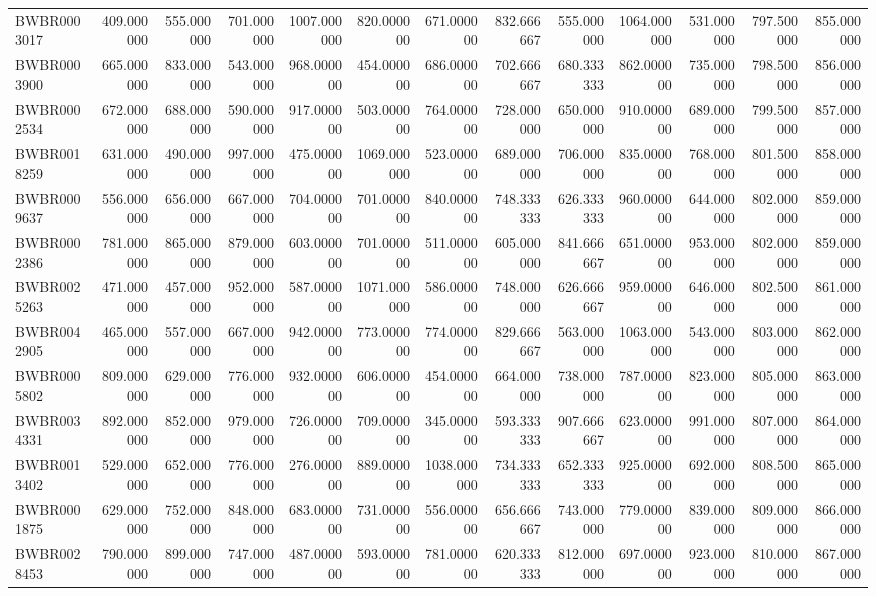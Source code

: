\begin{longtable}{lrrrrrrrrrrrr}
BWBR0003017 & 409.000000 & 555.000000 & 701.000000 & 1007.000000 & 820.000000 & 671.000000 & 832.666667 & 555.000000 & 1064.000000 & 531.000000 & 797.500000 & 855.000000 \\
BWBR0003900 & 665.000000 & 833.000000 & 543.000000 & 968.000000 & 454.000000 & 686.000000 & 702.666667 & 680.333333 & 862.000000 & 735.000000 & 798.500000 & 856.000000 \\
BWBR0002534 & 672.000000 & 688.000000 & 590.000000 & 917.000000 & 503.000000 & 764.000000 & 728.000000 & 650.000000 & 910.000000 & 689.000000 & 799.500000 & 857.000000 \\
BWBR0018259 & 631.000000 & 490.000000 & 997.000000 & 475.000000 & 1069.000000 & 523.000000 & 689.000000 & 706.000000 & 835.000000 & 768.000000 & 801.500000 & 858.000000 \\
BWBR0009637 & 556.000000 & 656.000000 & 667.000000 & 704.000000 & 701.000000 & 840.000000 & 748.333333 & 626.333333 & 960.000000 & 644.000000 & 802.000000 & 859.000000 \\
BWBR0002386 & 781.000000 & 865.000000 & 879.000000 & 603.000000 & 701.000000 & 511.000000 & 605.000000 & 841.666667 & 651.000000 & 953.000000 & 802.000000 & 859.000000 \\
BWBR0025263 & 471.000000 & 457.000000 & 952.000000 & 587.000000 & 1071.000000 & 586.000000 & 748.000000 & 626.666667 & 959.000000 & 646.000000 & 802.500000 & 861.000000 \\
BWBR0042905 & 465.000000 & 557.000000 & 667.000000 & 942.000000 & 773.000000 & 774.000000 & 829.666667 & 563.000000 & 1063.000000 & 543.000000 & 803.000000 & 862.000000 \\
BWBR0005802 & 809.000000 & 629.000000 & 776.000000 & 932.000000 & 606.000000 & 454.000000 & 664.000000 & 738.000000 & 787.000000 & 823.000000 & 805.000000 & 863.000000 \\
BWBR0034331 & 892.000000 & 852.000000 & 979.000000 & 726.000000 & 709.000000 & 345.000000 & 593.333333 & 907.666667 & 623.000000 & 991.000000 & 807.000000 & 864.000000 \\
BWBR0013402 & 529.000000 & 652.000000 & 776.000000 & 276.000000 & 889.000000 & 1038.000000 & 734.333333 & 652.333333 & 925.000000 & 692.000000 & 808.500000 & 865.000000 \\
BWBR0001875 & 629.000000 & 752.000000 & 848.000000 & 683.000000 & 731.000000 & 556.000000 & 656.666667 & 743.000000 & 779.000000 & 839.000000 & 809.000000 & 866.000000 \\
BWBR0028453 & 790.000000 & 899.000000 & 747.000000 & 487.000000 & 593.000000 & 781.000000 & 620.333333 & 812.000000 & 697.000000 & 923.000000 & 810.000000 & 867.000000 \\

\end{longtable}
